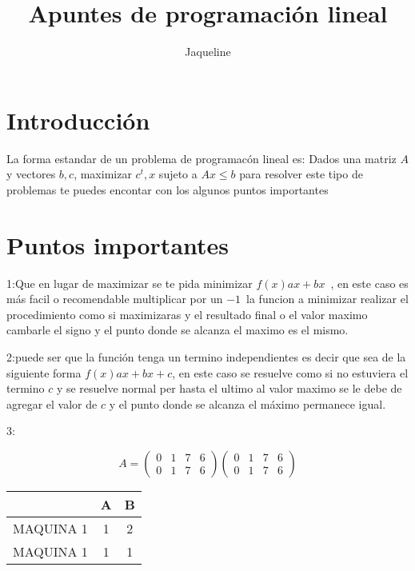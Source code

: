 \documentclass{article}
\title{Apuntes de programación lineal}
\author{Jaqueline}
\begin{document}
\maketitle
\tableofcontents
\section{Introducción}
\label{sec:introduccion}


La forma estandar de un problema de programacón lineal es:
Dados una matriz $A$ y vectores $b,c$, maximizar $c^t,x$ sujeto a
$Ax\leq b$
para resolver este tipo de problemas te puedes encontar con los
algunos puntos importantes 
\section{ Puntos importantes }
\label{sec:introduccion}

1:Que en lugar de maximizar se te pida minimizar $f(x)ax+bx$\ , en este caso es más
facil o recomendable multiplicar por un $-1$\ la funcion a minimizar
realizar el procedimiento como si maximizaras y el resultado final
o el valor maximo cambarle el signo y el punto donde se alcanza el maximo es el mismo.


2:puede ser que la función tenga un termino independientes es decir
que sea de la siguiente forma  $f(x)ax+bx+c$, en este caso se resuelve
como si no estuviera el termino $c$ y se resuelve normal per hasta el
ultimo al valor maximo se le debe de agregar el valor de $c$ y el
punto donde se alcanza el máximo permanece igual.




3:




\begin{equation}
  \label{eq:1}
  A=
  \begin{pmatrix}
    0&1&7&6\\
    0&1&7&6

  \end{pmatrix}
  \begin{pmatrix}
     0&1&7&6\\
    0&1&7&6
  \end{pmatrix}
\end{equation}



\begin{tabular}{|c|c|c|}
  \hline 
  &A&B\\
 \hline 
  MAQUINA 1  &1&2\\
  \hline 
  MAQUINA 1  &1&1\\
  \hline 
\end{tabular}
\end{document}
